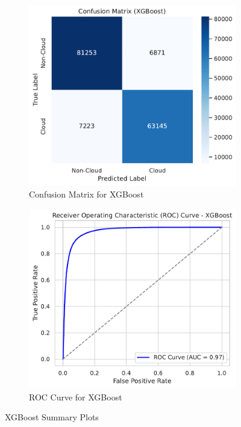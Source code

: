 \documentclass[11pt,letterpaper]{article}
\begin{document}
\begin{figure}[H]
  \centering
  \begin{subfigure}[b]{0.48\textwidth}
      \centering
      \includegraphics[width=\textwidth]{figs/xg1.pdf}
      \caption{Confusion Matrix for XGBoost}
      \label{fig:XGB_CM}
  \end{subfigure}
  \hfill
  \begin{subfigure}[b]{0.48\textwidth}
      \centering
      \includegraphics[width=\textwidth]{figs/xg2.pdf}
      \caption{ROC Curve for XGBoost}
      \label{fig:XGB_ROC}
  \end{subfigure}
  \caption{XGBoost Summary Plots}
  \label{fig:XGB_plots}
\end{figure}\noindent
\end{document}
